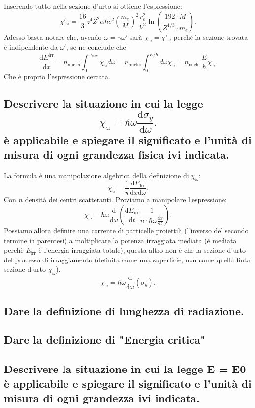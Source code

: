 Inserendo tutto nella sezione d'urto si ottiene l'espressione:
\[
	\chi'_{\omega}=\frac{16}{3}z^4Z^2\alpha\hbar c^2 \left( \frac{m_e}{M} \right)^2  \frac{r^2_e}{V^2}\ln\left( \frac{192\cdot M}{Z^{1 /3}\cdot m_e} \right) 
.\] 
Adesso basta notare che, avendo $\omega = \gamma \omega'$ sarà $\chi_{\omega}= \chi'_{\omega}$ perchè la sezione trovata è indipendente da $\omega'$, se ne conclude che:
\[
	\frac{\mbox{d} E^{\text{irr}}}{\mbox{d} x} = n_{\text{nuclei}} \int_{0}^{\omega_{\text{max}}} \chi_{\omega} d\omega = 
	n_{\text{nuclei}} \int_{0}^{E /\hbar} d\omega \chi_{\omega} 
	= n_{\text{nuclei}} \frac{E}{\hbar} \chi_{\omega}
.\] 
Che è proprio l'espressione cercata.
\subsection[]{Descrivere la situazione in cui la legge
\[
	\chi_{\omega} = \hbar \omega \frac{\text{d}\sigma_{y}}{\text{d}\omega}
.\] 
 è applicabile e spiegare il significato e l'unità di misura di ogni grandezza fisica ivi indicata.
}\label{sec:4.a.16}
La formula è una manipolazione algebrica della definizione di $\chi_{\omega}$:
\[
	\chi_{\omega}= \frac{1}{n} \frac{\mbox{d} E_{\text{irr}}}{\mbox{d} x \text{d}\omega} 
.\] 
Con $n$ densità dei centri scatteranti. Proviamo a manipolare l'espressione:
\[
	\chi_{\omega} = \hbar \omega\frac{\mbox{d}}{\mbox{d} \omega} \left( \frac{\mbox{d}E_{\text{irr}}}{\mbox{d}t}\frac{1}{n\cdot \hbar \omega \frac{\mbox{d} x}{\mbox{d} t} } \right)  
.\] 
Possiamo allora definire una corrente di particelle proiettili (l'inverso del secondo termine in parentesi) a moltiplicare la potenza irraggiata mediata (è mediata perchè $E_{\text{irr}}$ è l'energia irraggiata totale), questa altro non è che la sezione d'urto del processo di irraggiamento (definita come una superficie, non come quella finta sezione d'urto $\chi_{\omega}$).
\[
	\chi_{\omega}= \hbar \omega \frac{\mbox{d} }{\mbox{d} \omega} \left( \sigma_{y} \right) 
.\] 
\subsection[]{Dare la definizione di lunghezza di radiazione.
}\label{sec:4.a.17}
\subsection[]{Dare la definizione di "Energia critica"
}\label{sec:4.a.18}
\subsection[]{Descrivere la situazione in cui la legge E = E0 
 è applicabile e spiegare il significato e l'unità di misura di ogni grandezza ivi indicata.
}\label{sec:4.a.19}
